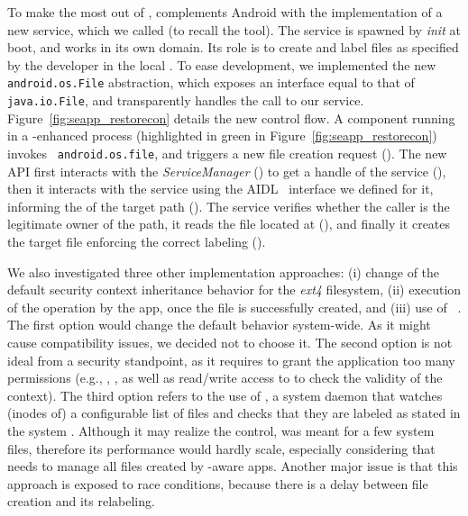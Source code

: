 To make the most out of \sel, \seapp complements Android with the
implementation of a new service, which we called \restorecon (to
recall the \sel \restoreconc tool).  The \restorecon service is
spawned by {\em init} at boot, and works in its own \sel domain.  Its
role is to create and label files as specified by the developer in the
local \filecontexts.  To ease development, we implemented the new {\tt
  android.os.File} abstraction, which exposes an interface equal to
that of {\tt java.io.File}, and transparently handles the call to our
service.  Figure~\ref{fig:seapp_restorecon} details the new control
flow.  A component running in a \seapp-enhanced process (highlighted in
green in Figure~\ref{fig:seapp_restorecon}) invokes {\tt
  android.os.file}, and triggers a new file creation request
().  The new API first interacts with the {\em
  ServiceManager} () to get a handle of the \restorecon
service (), then it interacts with the service using
the AIDL~\cite{seapp_aaidl} interface we defined for it, informing the
\restorecon of the target path ().  The \restorecon
service verifies whether the caller is the legitimate owner of the
path, it reads the \filecontexts file located at \dataselinuxdir
(), and finally it creates the target file enforcing
the correct labeling ().

We also investigated three other implementation approaches: (i) change
of the default security context inheritance behavior for the {\em
  ext4} filesystem, (ii) execution of the \sel \restorecon operation
by the app, once the file is successfully created, and (iii) use of
\restorecond~\cite{seapp_restorecondd}.  The first option would change
the default behavior system-wide.  As it might cause compatibility
issues, we decided not to choose it.  The second option is not ideal
from a security standpoint, as it requires to grant the application
too many permissions (e.g., \relabelfrom, \relabelto, as well as
read/write access to \selinuxfs to check the validity of the \sel
context).  The third option refers to the use of \restorecond, a
system daemon that watches (inodes of) a configurable list of files
and checks that they are labeled as stated in the system
\filecontexts.  Although it may realize the control, \restorecond was
meant for a few system files, therefore its performance would hardly
scale, especially considering that \seapp needs to manage all files
created by \seapp-aware apps.  Another major issue is that this approach
is exposed to race conditions, because there is a delay between file
creation and its relabeling.


